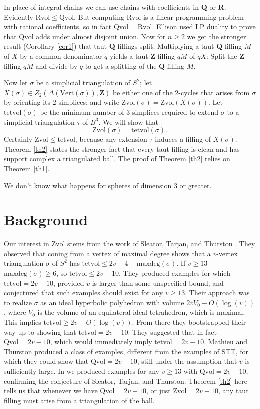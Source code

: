\documentclass[12pt]{article}
\def\ZZ{\mathbf{Z}}
\def\QQ{\mathbf{Q}}
\def\RR{\mathbf{R}}
\newcommand{\kw}{\mathrm}
\newcommand{\maxdeg}{\kw{maxdeg}}
\newcommand{\vertices}{\kw{Vert}}
\newcommand{\Zvol}{\kw{Zvol}}
\newcommand{\Qvol}{\kw{Qvol}}
\newcommand{\Rvol}{\kw{Rvol}}
\newcommand{\tetvol}{\kw{tetvol}}
\begin{document}
In place of integral chains we can use chains with
coefficients in $\QQ$ or $\RR$.
Evidently $\Rvol \leq \Qvol$.
But computing $\Rvol$ is
a linear programming problem with rational coefficients,
so in fact $\Qvol = \Rvol$.
Ellison used LP duality to prove that
$\Qvol$ adds under almost
disjoint union.
Now for $n \geq 2$ we get the stronger result
(Corollary \ref{cor1})
that taut $\QQ$-fillings split:
Multiplying a taut
$\QQ$-filling $M$ of $X$ by a common denominator $q$
yields a taut $\ZZ$-filling $qM$ of $qX$:
Split the $\ZZ$-filling $qM$ and divide by $q$ to get a splitting
of the $\QQ$-filling $M$.

Now let $\sigma$ be a simplicial triangulation of $S^2$;
let $X(\sigma) \in Z_2(\Delta(\vertices(\sigma)),\ZZ)$
be either one of the 2-cycles
that arises from $\sigma$ by orienting its $2$-simplices;
and write $\Zvol(\sigma) = \Zvol(X(\sigma))$.
Let $\tetvol(\sigma)$ be the minimum number of $3$-simplices
required to extend $\sigma$ to a simplicial triangulation $\tau$ of $B^3$.
We will show that
\[
\Zvol(\sigma) = \tetvol(\sigma)
.
\]
Certainly $\Zvol \leq \tetvol$,
because any extension $\tau$ induces a filling
of $X(\sigma)$.
Theorem \ref{th2} states the stronger fact that every taut filling is clean and has support complex a triangulated ball.  The proof of Theorem \ref{th2} relies on Theorem \ref{th1}.

We don't know what happens for spheres of dimension 3 or greater.

\section{Background}

Our interest in $\Zvol$ stems from the work
of Sleator, Tarjan, and Thurston
\cite{stt:jams}.
They observed that coning from a vertex of maximal degree
shows that a $v$-vertex
triangulation $\sigma$
of $S^2$ has $\tetvol \leq 2v-4-\maxdeg(\sigma)$.
If $v\geq13$ $\maxdeg(\sigma) \geq 6$, so $\tetvol \leq 2v-10$.
They
produced examples for which $\tetvol = 2v-10$, provided
$v$ is larger than some unspecified bound,
and conjectured that such examples should exist for any $v \geq 13$.
Their approach was to 
realize $\sigma$ as an ideal hyperbolic polyhedron
with volume $2v V_0-O(\log(v))$,
where $V_0$ is the volume of an
equilateral ideal tetrahedron,
which is maximal.
This implies $\tetvol \geq 2v-O(\log(v))$.
From there they bootstrapped their way up to showing
that $\tetvol=2v-10$.
They suggested
\cite[p. 697]{stt:jams}
that in fact $\Qvol= 2v-10$,
which would immediately imply $\tetvol=2v-10$.
Mathieu and Thurston \cite{mt}
produced a class of examples,
different from the examples of STT,
for which they could show that $\Qvol = 2v-10$,
still under the assumption that $v$
is sufficiently large.
In \cite{dew:filling} we produced examples for any $v \geq 13$ with
$\Qvol=2v-10$, confirming the conjecture of Sleator, Tarjan, and Thurston.
Theorem \ref{th2} here
tells us that whenever we have $\Qvol=2v-10$,
or just $\Zvol=2v-10$, any taut filling
must arise from a triangulation of the ball.
\end{document}
